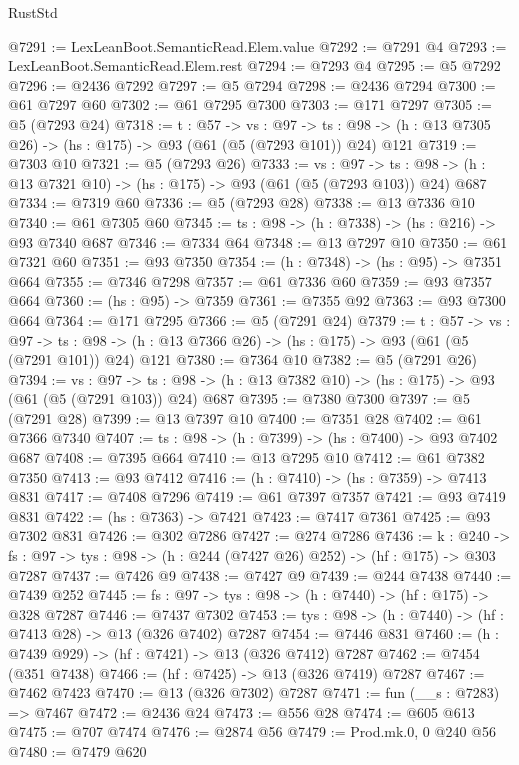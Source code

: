 \begin{lexlean}{RustStd}
\begin{coremodule}
@7291 := LexLeanBoot.SemanticRead.Elem.value
@7292 := @7291 @4
@7293 := LexLeanBoot.SemanticRead.Elem.rest
@7294 := @7293 @4
@7295 := @5 @7292
@7296 := @2436 @7292
@7297 := @5 @7294
@7298 := @2436 @7294
@7300 := @61 @7297 @60
@7302 := @61 @7295 @7300
@7303 := @171 @7297
@7305 := @5 (@7293 @24)
@7318 := {t : @57} ->
  {vs : @97} ->
  {ts : @98} -> (h : @13 @7305 @26) -> (hs : @175) -> @93 (@61 (@5 (@7293 @101)) @24) @121
@7319 := @7303 @10
@7321 := @5 (@7293 @26)
@7333 := {vs : @97} ->
  {ts : @98} -> (h : @13 @7321 @10) -> (hs : @175) -> @93 (@61 (@5 (@7293 @103)) @24) @687
@7334 := @7319 @60
@7336 := @5 (@7293 @28)
@7338 := @13 @7336 @10
@7340 := @61 @7305 @60
@7345 := {ts : @98} -> (h : @7338) -> (hs : @216) -> @93 @7340 @687
@7346 := @7334 @64
@7348 := @13 @7297 @10
@7350 := @61 @7321 @60
@7351 := @93 @7350
@7354 := (h : @7348) -> (hs : @95) -> @7351 @664
@7355 := @7346 @7298
@7357 := @61 @7336 @60
@7359 := @93 @7357 @664
@7360 := (hs : @95) -> @7359
@7361 := @7355 @92
@7363 := @93 @7300 @664
@7364 := @171 @7295
@7366 := @5 (@7291 @24)
@7379 := {t : @57} ->
  {vs : @97} ->
  {ts : @98} -> (h : @13 @7366 @26) -> (hs : @175) -> @93 (@61 (@5 (@7291 @101)) @24) @121
@7380 := @7364 @10
@7382 := @5 (@7291 @26)
@7394 := {vs : @97} ->
  {ts : @98} -> (h : @13 @7382 @10) -> (hs : @175) -> @93 (@61 (@5 (@7291 @103)) @24) @687
@7395 := @7380 @7300
@7397 := @5 (@7291 @28)
@7399 := @13 @7397 @10
@7400 := @7351 @28
@7402 := @61 @7366 @7340
@7407 := {ts : @98} -> (h : @7399) -> (hs : @7400) -> @93 @7402 @687
@7408 := @7395 @664
@7410 := @13 @7295 @10
@7412 := @61 @7382 @7350
@7413 := @93 @7412
@7416 := (h : @7410) -> (hs : @7359) -> @7413 @831
@7417 := @7408 @7296
@7419 := @61 @7397 @7357
@7421 := @93 @7419 @831
@7422 := (hs : @7363) -> @7421
@7423 := @7417 @7361
@7425 := @93 @7302 @831
@7426 := @302 @7286
@7427 := @274 @7286
@7436 := {k : @240} ->
  {fs : @97} -> {tys : @98} -> (h : @244 (@7427 @26) @252) -> (hf : @175) -> @303 @7287
@7437 := @7426 @9
@7438 := @7427 @9
@7439 := @244 @7438
@7440 := @7439 @252
@7445 := {fs : @97} -> {tys : @98} -> (h : @7440) -> (hf : @175) -> @328 @7287
@7446 := @7437 @7302
@7453 := {tys : @98} -> (h : @7440) -> (hf : @7413 @28) -> @13 (@326 @7402) @7287
@7454 := @7446 @831
@7460 := (h : @7439 @929) -> (hf : @7421) -> @13 (@326 @7412) @7287
@7462 := @7454 (@351 @7438)
@7466 := (hf : @7425) -> @13 (@326 @7419) @7287
@7467 := @7462 @7423
@7470 := @13 (@326 @7302) @7287
@7471 := fun (__s : @7283) => @7467
@7472 := @2436 @24
@7473 := @556 @28
@7474 := @605 @613
@7475 := @707 @7474
@7476 := @2874 @56
@7479 := Prod.mk.{0, 0} @240 @56
@7480 := @7479 @620

\end{coremodule}
\end{lexlean}

